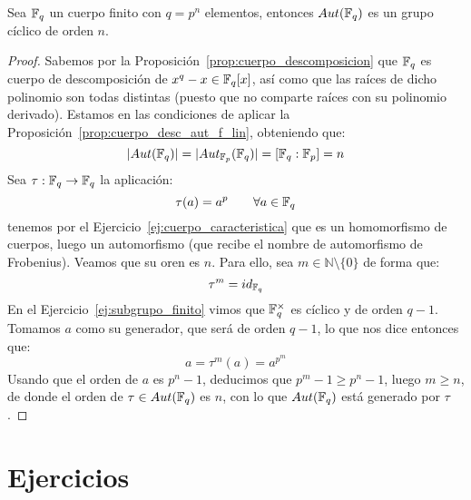\begin{teo}
    Sea $\mathbb{F}_q$ un cuerpo finito con $q=p^n$ elementos, entonces $Aut(\mathbb{F}_q)$ es un grupo cíclico de orden $n$.
    \begin{proof}
        Sabemos por la Proposición~\ref{prop:cuerpo_descomposicion} que $\mathbb{F}_q$ es cuerpo de descomposición de $x^q-x\in \mathbb{F}_q[x]$, así como que las raíces de dicho polinomio son todas distintas (puesto que no comparte raíces con su polinomio derivado). Estamos en las condiciones de aplicar la Proposición~\ref{prop:cuerpo_desc_aut_f_lin}, obteniendo que:
        \begin{equation*}
            |Aut(\mathbb{F}_q)| = |Aut_{\mathbb{F}_p}(\mathbb{F}_q)| = [\mathbb{F}_q : \mathbb{F}_p] = n
        \end{equation*}
        Sea $\tau:\mathbb{F}_q\to \mathbb{F}_q$ la aplicación:
        \begin{equation*}
            \tau(a) = a^{p} \qquad \forall a\in \mathbb{F}_q
        \end{equation*}
        tenemos por el Ejercicio~\ref{ej:cuerpo_caracteristica} que es un homomorfismo de cuerpos, luego un automorfismo (que recibe el nombre de automorfismo de Frobenius). Veamos que su oren es $n$. Para ello, sea $m\in \mathbb{N}\setminus \{0\}$ de forma que:
        \begin{equation*}
            \tau^m = id_{\mathbb{F}_q}
        \end{equation*}
        En el Ejercicio~\ref{ej:subgrupo_finito} vimos que $\mathbb{F}_q^{\times}$ es cíclico y de orden $q-1$. Tomamos $a$ como su generador, que será de orden $q-1$, lo que nos dice entonces que:
        \begin{equation*}
            a = \tau^m (a)  = a^{p^m}
        \end{equation*}
        Usando que el orden de $a$ es $p^n-1$, deducimos que $p^m -1\geq p^n -1$, luego $m\geq n$, de donde el orden de $\tau\in Aut(\mathbb{F}_q)$ es $n$, con lo que $Aut(\mathbb{F}_q)$ está generado por $\tau$.
    \end{proof}
\end{teo}

\section{Ejercicios}

